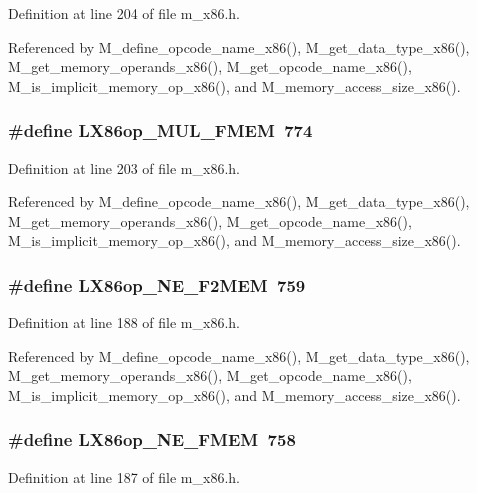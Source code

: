 Definition at line 204 of file m\_\-x86.h.

Referenced by M\_\-define\_\-opcode\_\-name\_\-x86(), M\_\-get\_\-data\_\-type\_\-x86(), M\_\-get\_\-memory\_\-operands\_\-x86(), M\_\-get\_\-opcode\_\-name\_\-x86(), M\_\-is\_\-implicit\_\-memory\_\-op\_\-x86(), and M\_\-memory\_\-access\_\-size\_\-x86().
\subsubsection{\setlength{\rightskip}{0pt plus 5cm}\#define LX86op\_\-MUL\_\-FMEM~774}\label{m__x86_8h_f1aadb70fdf39b70dd4a5574dad21172}




Definition at line 203 of file m\_\-x86.h.

Referenced by M\_\-define\_\-opcode\_\-name\_\-x86(), M\_\-get\_\-data\_\-type\_\-x86(), M\_\-get\_\-memory\_\-operands\_\-x86(), M\_\-get\_\-opcode\_\-name\_\-x86(), M\_\-is\_\-implicit\_\-memory\_\-op\_\-x86(), and M\_\-memory\_\-access\_\-size\_\-x86().
\subsubsection{\setlength{\rightskip}{0pt plus 5cm}\#define LX86op\_\-NE\_\-F2MEM~759}\label{m__x86_8h_1a939b983235186cc779f72963e19b73}




Definition at line 188 of file m\_\-x86.h.

Referenced by M\_\-define\_\-opcode\_\-name\_\-x86(), M\_\-get\_\-data\_\-type\_\-x86(), M\_\-get\_\-memory\_\-operands\_\-x86(), M\_\-get\_\-opcode\_\-name\_\-x86(), M\_\-is\_\-implicit\_\-memory\_\-op\_\-x86(), and M\_\-memory\_\-access\_\-size\_\-x86().
\subsubsection{\setlength{\rightskip}{0pt plus 5cm}\#define LX86op\_\-NE\_\-FMEM~758}\label{m__x86_8h_238e9d7a3b8c9c8d22776f1961e04136}




Definition at line 187 of file m\_\-x86.h.

